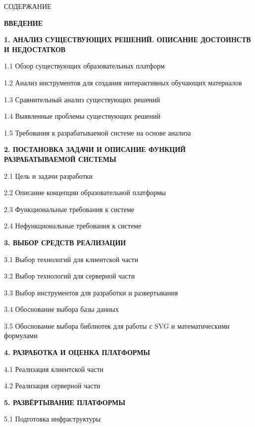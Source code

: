 {\gostTitleFont
    \redline
    СОДЕРЖАНИЕ
} 

\titlespace

{\gostFont
    \par
    \par {\bfseries ВВЕДЕНИЕ }
    \par {\bfseries 1. АНАЛИЗ СУЩЕСТВУЮЩИХ РЕШЕНИЙ. ОПИСАНИЕ ДОСТОИНСТВ И НЕДОСТАТКОВ }
    \par 1.1 Обзор существующих образовательных платформ 
    \par 1.2 Анализ инструментов для создания интерактивных обучающих материалов 
    \par 1.3 Сравнительный анализ существующих решений 
    \par 1.4 Выявленные проблемы существующих решений 
    \par 1.5 Требования к разрабатываемой системе на основе анализа 
    \par {\bfseries 2. ПОСТАНОВКА ЗАДАЧИ И ОПИСАНИЕ ФУНКЦИЙ РАЗРАБАТЫВАЕМОЙ СИСТЕМЫ }
    \par 2.1 Цель и задачи разработки 
    \par 2.2 Описание концепции образовательной платформы 
    \par 2.3 Функциональные требования к системе 
    \par 2.4 Нефункциональные требования к системе 
    \par {\bfseries 3. ВЫБОР СРЕДСТВ РЕАЛИЗАЦИИ }
    \par 3.1 Выбор технологий для клиентской части 
    \par 3.2 Выбор технологий для серверной части 
    \par 3.3 Выбор инструментов для разработки и развертывания 
    \par 3.4 Обоснование выбора базы данных 
    \par 3.5 Обоснование выбора библиотек для работы с SVG и математическими формулами 
    \par {\bfseries 4. РАЗРАБОТКА И ОЦЕНКА ПЛАТФОРМЫ }
    \par 4.1 Реализация клиентской части 
    \par 4.2 Реализация серверной части 
    \par {\bfseries 5. РАЗВЁРТЫВАНИЕ ПЛАТФОРМЫ }
    \par 5.1 Подготовка инфраструктуры 
}
